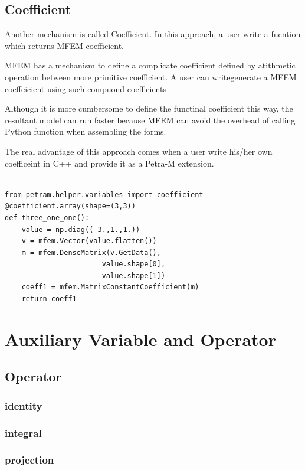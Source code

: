 \documentclass[11pt,a4paper,final]{report}
\begin{document}
\subsection{Coefficient}
Another mechanism is called Coefficient. 
In this approach, a user write a fucntion which returns MFEM coefficient. 

MFEM has a mechanism to define a complicate coefficient defined by atithmetic operation between more primitive coefficient. 
A user can writegenerate a MFEM coeffeicient using such compuond coefficients

Although it is more cumbersome to define the functinal coefficient this way, the resultant model can run faster because MFEM can avoid the overhead of calling Python function when assembling the forms.

The real advantage of this approach comes when a user write his/her own coefficeint in C++ and provide it as a Petra-M extension.  


\begin{minipage}[c]{0.95\textwidth}
\begin{lstlisting}[caption={A user defined generic preconditioner},captionpos=b, frame=single, label={function1}]

from petram.helper.variables import coefficient
@coefficient.array(shape=(3,3))
def three_one_one():
    value = np.diag((-3.,1.,1.))
    v = mfem.Vector(value.flatten())
    m = mfem.DenseMatrix(v.GetData(), 
                       value.shape[0], 
                       value.shape[1])       
    coeff1 = mfem.MatrixConstantCoefficient(m)
    return coeff1

\end{lstlisting}
 \end{minipage}
 
\section{Auxiliary Variable and Operator}
\subsection{Operator}
\subsubsection{identity}            
\subsubsection{integral}
\subsubsection{projection}
\end{document}
